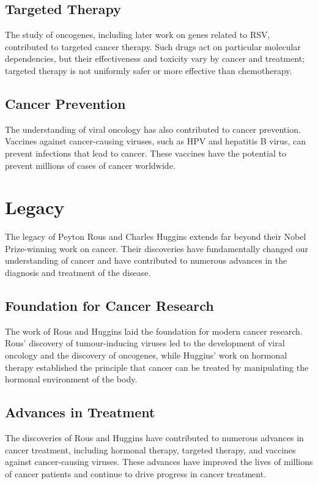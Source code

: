 \subsection{Targeted Therapy}

The study of oncogenes, including later work on genes related to RSV, contributed to targeted cancer therapy. Such drugs act on particular molecular dependencies, but their effectiveness and toxicity vary by cancer and treatment; targeted therapy is not uniformly safer or more effective than chemotherapy.

\subsection{Cancer Prevention}

The understanding of viral oncology has also contributed to cancer prevention. Vaccines against cancer-causing viruses, such as HPV and hepatitis B virus, can prevent infections that lead to cancer. These vaccines have the potential to prevent millions of cases of cancer worldwide.

\section{Legacy}

The legacy of Peyton Rous and Charles Huggins extends far beyond their Nobel Prize-winning work on cancer. Their discoveries have fundamentally changed our understanding of cancer and have contributed to numerous advances in the diagnosis and treatment of the disease.

\subsection{Foundation for Cancer Research}

The work of Rous and Huggins laid the foundation for modern cancer research. Rous' discovery of tumour-inducing viruses led to the development of viral oncology and the discovery of oncogenes, while Huggins' work on hormonal therapy established the principle that cancer can be treated by manipulating the hormonal environment of the body.

\subsection{Advances in Treatment}

The discoveries of Rous and Huggins have contributed to numerous advances in cancer treatment, including hormonal therapy, targeted therapy, and vaccines against cancer-causing viruses. These advances have improved the lives of millions of cancer patients and continue to drive progress in cancer treatment.

